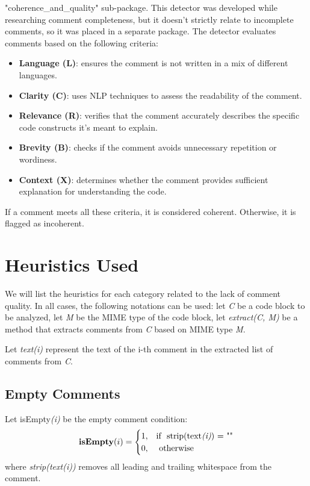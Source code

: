 \noindent "coherence\_and\_quality" sub-package. This detector was developed while researching comment completeness, but it doesn’t strictly relate to incomplete comments, so it was placed in a separate package. The detector evaluates comments based on the following criteria:
	\begin{itemize}
		\item \textbf{Language (L)}: ensures the comment is not written in a mix of different languages.
		\item \textbf{Clarity (C)}: uses NLP techniques to assess the readability of the comment.
		\item \textbf{Relevance (R)}: verifies that the comment accurately describes the specific code constructs it’s meant to explain.
		\item \textbf{Brevity (B)}: checks if the comment avoids unnecessary repetition or wordiness.
		\item \textbf{Context (X)}: determines whether the comment provides sufficient explanation for understanding the code.
	\end{itemize}
If a comment meets all these criteria, it is considered coherent. Otherwise, it is flagged as incoherent.
	
\section{Heuristics Used}
We will list the heuristics for each category related to the lack of comment quality.
In all cases, the following notations can be used: let \textit{C} be a code block to be analyzed, let \textit{M} be the MIME type of the code block, let \textit{extract(C, M)} be a method that extracts comments from \textit{C} based on MIME type \textit{M}.

\noindent Let \textit{text(i)} represent the text of the i-th comment in the extracted list of comments from \textit{C}.

\subsection{Empty Comments}
\noindent Let isEmpty\textit{(i)} be the empty comment condition: 
\begin{equation*}
	\textbf{isEmpty}(i) = \begin{cases}
		1, & \text{if } \text{ strip(text\textit{(i)}) = ""} \\
		0, & \text{ otherwise}
	\end{cases}
\end{equation*}
where \textit{strip(text(i))} removes all leading and trailing whitespace from the comment.

